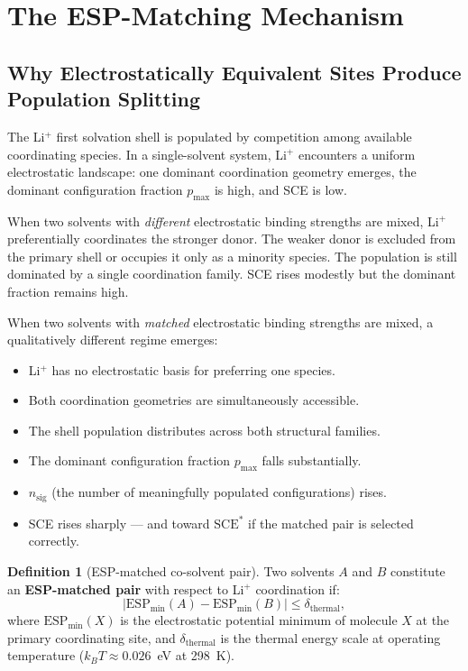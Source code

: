 \documentclass[11pt]{article}
\theoremstyle{plain}
\theoremstyle{definition}
\newtheorem{definition}{Definition}[section]
\theoremstyle{remark}
\begin{document}
\section{The ESP-Matching Mechanism}
\label{sec:esp_theory}

\subsection{Why Electrostatically Equivalent Sites Produce Population Splitting}

The Li$^+$ first solvation shell is populated by competition among available
coordinating species.  In a single-solvent system, Li$^+$ encounters a
uniform electrostatic landscape: one dominant coordination geometry emerges,
the dominant configuration fraction $p_{\max}$ is high, and SCE is low.

When two solvents with \emph{different} electrostatic binding strengths are
mixed, Li$^+$ preferentially coordinates the stronger donor.  The weaker
donor is excluded from the primary shell or occupies it only as a minority
species.  The population is still dominated by a single coordination
family.  SCE rises modestly but the dominant fraction remains high.

When two solvents with \emph{matched} electrostatic binding strengths are
mixed, a qualitatively different regime emerges:

\begin{itemize}[leftmargin=2em]
  \item Li$^+$ has no electrostatic basis for preferring one species.
  \item Both coordination geometries are simultaneously accessible.
  \item The shell population distributes across both structural families.
  \item The dominant configuration fraction $p_{\max}$ falls substantially.
  \item $n_{\mathrm{sig}}$ (the number of meaningfully populated
        configurations) rises.
  \item SCE rises sharply --- and toward $\mathrm{SCE}^{*}$ if the
        matched pair is selected correctly.
\end{itemize}

\begin{definition}[ESP-matched co-solvent pair]
Two solvents $A$ and $B$ constitute an \textbf{ESP-matched pair} with
respect to Li$^+$ coordination if:
\begin{equation}
  \left|\mathrm{ESP}_{\min}(A) - \mathrm{ESP}_{\min}(B)\right|
  \leq \delta_{\mathrm{thermal}},
  \label{eq:ESP_match}
\end{equation}
where $\mathrm{ESP}_{\min}(X)$ is the electrostatic potential minimum of
molecule $X$ at the primary coordinating site, and $\delta_{\mathrm{thermal}}$
is the thermal energy scale at operating temperature
($k_B T \approx 0.026$~eV at 298~K).
\end{definition}
\end{document}
